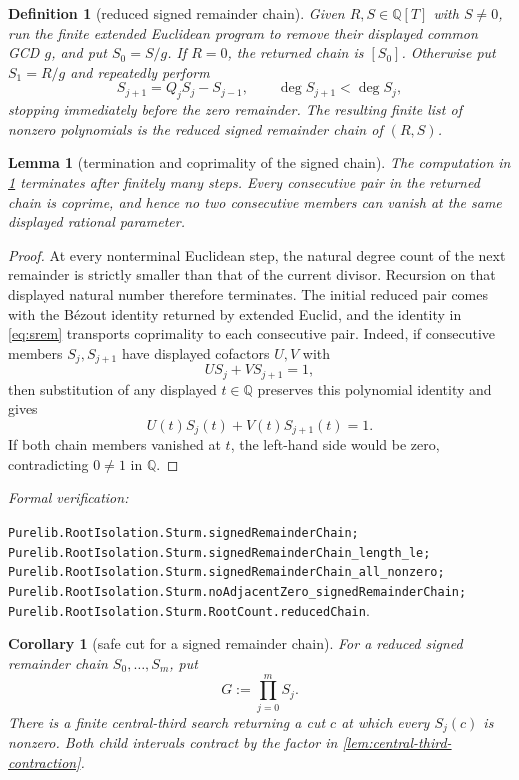 \documentclass[11pt]{article}
\newtheorem{lemma}[theorem]{Lemma}
\newtheorem{corollary}[theorem]{Corollary}
\newtheorem{definition}[theorem]{Definition}
\newcommand{\Q}{\mathbb{Q}}
\newcommand{\leanref}[1]{\par\smallskip\noindent
  \emph{Formal verification:}\par\nobreak
  {\raggedright\nolinkurl{#1}.\par}}
\begin{document}
\begin{definition}[reduced signed remainder chain]
\label{def:reduced-signed-remainder-chain}
Given $R,S\in\Q[T]$ with $S\ne0$, run the finite extended Euclidean program
to remove their displayed common GCD $g$, and put $S_0=S/g$.  If $R=0$,
the returned chain is $[S_0]$.  Otherwise put $S_1=R/g$ and repeatedly
perform
\begin{equation}
\label{eq:srem}
       S_{j+1}=Q_jS_j-S_{j-1},\qquad \deg S_{j+1}<\deg S_j,
\end{equation}
stopping immediately before the zero remainder.  The resulting finite list
of nonzero polynomials is the \emph{reduced signed remainder chain} of
$(R,S)$.
\end{definition}

\begin{lemma}[termination and coprimality of the signed chain]
\label{lem:signed-chain-termination}
The computation in \cref{def:reduced-signed-remainder-chain} terminates after
finitely many steps.  Every consecutive pair in the returned chain is
coprime, and hence no two consecutive members can vanish at the same
displayed rational parameter.
\end{lemma}

\begin{proof}
At every nonterminal Euclidean step, the natural degree count of the next
remainder is strictly smaller than that of the current divisor.  Recursion
on that displayed natural number therefore terminates.  The initial reduced
pair comes with the B\'ezout identity returned by extended Euclid, and the
identity in \eqref{eq:srem} transports coprimality to each consecutive pair.
Indeed, if consecutive members $S_j,S_{j+1}$ have displayed cofactors $U,V$
with
\[
                       US_j+VS_{j+1}=1,
\]
then substitution of any displayed $t\in\Q$ preserves this polynomial
identity and gives
\[
             U(t)S_j(t)+V(t)S_{j+1}(t)=1.
\]
If both chain members vanished at $t$, the left-hand side would be zero,
contradicting $0\ne1$ in $\Q$.
\end{proof}

\leanref{Purelib.RootIsolation.Sturm.signedRemainderChain;
Purelib.RootIsolation.Sturm.signedRemainderChain_length_le;
Purelib.RootIsolation.Sturm.signedRemainderChain_all_nonzero;
Purelib.RootIsolation.Sturm.noAdjacentZero_signedRemainderChain;
Purelib.RootIsolation.Sturm.RootCount.reducedChain}

\begin{corollary}[safe cut for a signed remainder chain]
\label{cor:sturm-safe-cut}
For a reduced signed remainder chain $S_0,\ldots,S_m$, put
\[
                         G:=\prod_{j=0}^{m}S_j.
\]
There is a finite central-third search returning a cut $c$ at which every
$S_j(c)$ is nonzero.  Both child intervals contract by the factor in
\cref{lem:central-third-contraction}.
\end{corollary}
\end{document}
